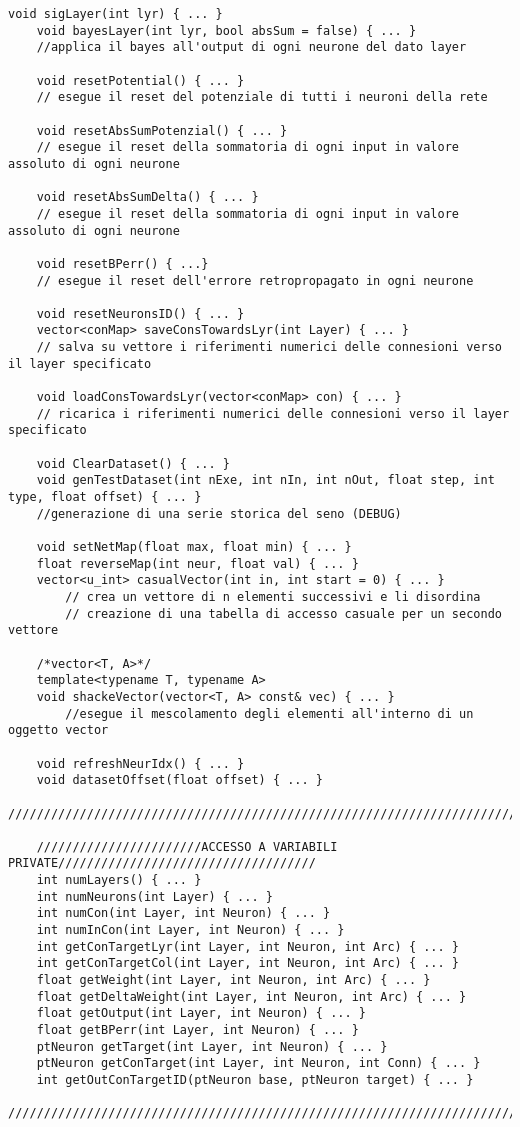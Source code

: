 \documentclass[10pt,a4paper]{article}
\begin{document}
\begin{lstlisting}[style=mycuda, caption=class Network, captionpos=b]
	void sigLayer(int lyr) { ... }
	void bayesLayer(int lyr, bool absSum = false) { ... }
	//applica il bayes all'output di ogni neurone del dato layer
	
	void resetPotential() { ... }
	// esegue il reset del potenziale di tutti i neuroni della rete
		
	void resetAbsSumPotenzial() { ... }
	// esegue il reset della sommatoria di ogni input in valore assoluto di ogni neurone
		
	void resetAbsSumDelta() { ... }
	// esegue il reset della sommatoria di ogni input in valore assoluto di ogni neurone
		
	void resetBPerr() { ...}
	// esegue il reset dell'errore retropropagato in ogni neurone
		
	void resetNeuronsID() { ... }
	vector<conMap> saveConsTowardsLyr(int Layer) { ... }
	// salva su vettore i riferimenti numerici delle connesioni verso il layer specificato
		
	void loadConsTowardsLyr(vector<conMap> con) { ... } 
	// ricarica i riferimenti numerici delle connesioni verso il layer specificato
		
	void ClearDataset() { ... }
	void genTestDataset(int nExe, int nIn, int nOut, float step, int type, float offset) { ... }
	//generazione di una serie storica del seno (DEBUG)
		
	void setNetMap(float max, float min) { ... }
	float reverseMap(int neur, float val) { ... }
	vector<u_int> casualVector(int in, int start = 0) { ... }
		// crea un vettore di n elementi successivi e li disordina
		// creazione di una tabella di accesso casuale per un secondo vettore
		
	/*vector<T, A>*/
	template<typename T, typename A>
	void shackeVector(vector<T, A> const& vec) { ... }
		//esegue il mescolamento degli elementi all'interno di un oggetto vector 
		
	void refreshNeurIdx() { ... }
	void datasetOffset(float offset) { ... }
	//////////////////////////////////////////////////////////////////////////////////////
	
	///////////////////////ACCESSO A VARIABILI PRIVATE////////////////////////////////////
	int numLayers() { ... }
	int numNeurons(int Layer) { ... }
	int numCon(int Layer, int Neuron) { ... }
	int numInCon(int Layer, int Neuron) { ... }
	int getConTargetLyr(int Layer, int Neuron, int Arc) { ... }
	int getConTargetCol(int Layer, int Neuron, int Arc) { ... }
	float getWeight(int Layer, int Neuron, int Arc) { ... }
	float getDeltaWeight(int Layer, int Neuron, int Arc) { ... }
	float getOutput(int Layer, int Neuron) { ... }
	float getBPerr(int Layer, int Neuron) { ... }
	ptNeuron getTarget(int Layer, int Neuron) { ... }
	ptNeuron getConTarget(int Layer, int Neuron, int Conn) { ... }
	int getOutConTargetID(ptNeuron base, ptNeuron target) { ... }
	//////////////////////////////////////////////////////////////////////////////////////
	

\end{lstlisting}
\end{document}

